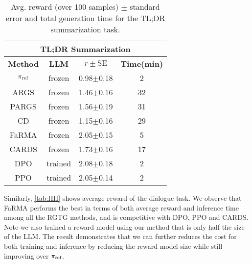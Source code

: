 \begin{table}[ht]
  \centering
  \footnotesize
  \begin{tabular}{cccc}
    \toprule
    \multicolumn{4}{c}{\textbf{TL;DR Summarization}}                    \\
    \midrule
    \textbf{Method} & \textbf{LLM}  & $r \pm \text{SE}$  & \textbf{Time(min)}    \\
    \midrule
    $\pi_\text{ref}$       & frozen         & 0.98$\pm$0.18    & 2     \\
    \midrule
    ARGS            & frozen        & 1.46$\pm$0.16   & 32       \\
    PARGS       & frozen         & 1.56$\pm$0.19    & 31     \\
    CD       & frozen         & 1.15$\pm$0.16    & 29     \\
    FaRMA     & frozen     & 2.05$\pm$0.15  &  5        \\
    CARDS             & frozen  & 1.73$\pm$0.16 & 17       \\
    \midrule
    DPO             & trained    & 2.08$\pm$0.18  & 2        \\
    PPO             & trained   & 2.05$\pm$0.14  & 2   \\
    \bottomrule
  \end{tabular}
  \caption{Avg. reward (over 100 samples) $\pm$ standard error and total generation time for the TL;DR summarization task.}
  \label{tab:TLDR}
   \vspace{-1em}
\end{table}


Similarly, \cref{tab:HH} shows average reward of the dialogue task. We observe that FaRMA performs the best in terms of both average reward and inference time among all the RGTG methods, and is competitive with DPO, PPO and CARDS. Note we also trained a reward model using our method that is only half the size of the LLM. The result demonstrates that we can further reduces the cost for both training and inference by reducing the reward model size while still improving over $\pi_\text{ref}$.

